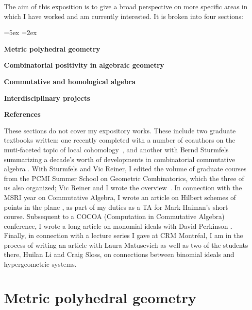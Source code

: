 \documentclass[11pt]{proposal}
\begin{document}
The aim of this exposition is to give a broad
perspective on more specific areas in which I have worked and am
currently interested.  It is broken into four sections:
\begin{list}{.}
           {\leftmargin=5ex \rightmargin=2ex 
	    \itemsep=-1.5mm \topsep=-1.5mm}
\item
{\bf Metric polyhedral geometry}
	\hfill\pageref{s:metric}
\item
{\bf Combinatorial positivity in algebraic geometry}
	\hfill\pageref{s:positivity}
\item
{\bf Commutative and homological algebra}
	\hfill\pageref{s:commalg}
\item
{\bf Interdisciplinary projects}
	\hfill\pageref{s:inter}
\item
{\bf References}
	\hfill\pageref{s:refs}
\end{list} \vspace{1.5mm}
These sections do not cover my expository works.  These include two
graduate textbooks written: one recently completed with a number of
coauthors on the muti-faceted topic of local
cohomology~\cite{24hours}, and another with Bernd Sturmfels
summarizing a decade's worth of developments in combinatorial
commutative algebra \cite{cca}.  With Sturmfels and Vic Reiner, I
edited the volume \cite{pcmi2004} of graduate courses from the PCMI
Summer School on Geometric Combinatorics, which the three of us also
organized; Vic Reiner and I wrote the overview~\cite{overview}.  In
connection with the MSRI year on Commutative Algebra, I wrote an
article on Hilbert schemes of points in the plane \cite{hilbAppendix},
as part of my duties as a TA for Mark Haiman's short course.
Subsequent to a COCOA (Computation in Commutative Algebra) conference,
I wrote a long article on monomial ideals with David Perkinson
\cite{eightLect}.  Finally, in connection with a lecture series I gave
at CRM Montr\'eal, I am in the process of writing an article with
Laura Matusevich as well as two of the students there, Huilan Li and
Craig Sloss, on connections between binomial ideals and hypergeometric
systems.


\section{Metric polyhedral geometry}%
\end{document}
